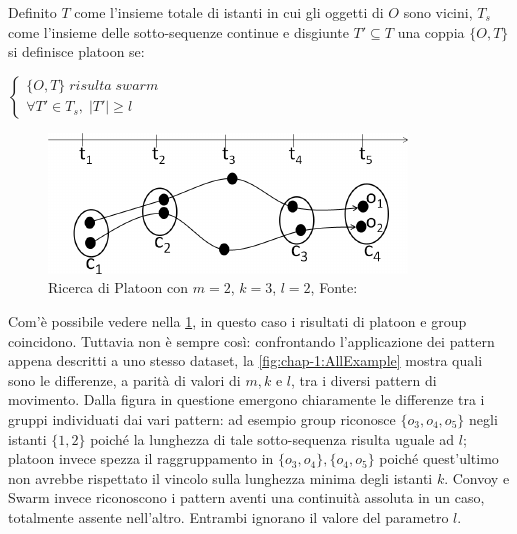 \begin{definition}[Platoon]\label{definition:platoon}
  Definito \(T\) come l'insieme totale di istanti in cui gli oggetti di \(O\) sono vicini,
  \(T_s\) come l'insieme delle sotto-sequenze continue e disgiunte \(T' \subseteq T\)
  una coppia \( \{ O, T \} \) si definisce platoon se:
  \begin{center}
    \(
      \begin{cases}
         \{ O, T \} \; risulta \; swarm   \\
      \forall T' \in T_{s}, \; |T'| \geq l
      \end{cases}
    \)
  \end{center}
\end{definition}

\begin{figure}
  \centering
  \includegraphics[width=\textwidth]{res/fig/sec-2/Group.pdf}
  \caption{Ricerca di Platoon con \(m = 2\), \(k = 3\), \(l=2\), Fonte:\cite{DBLP:journals/ijitdm/PhanPT16}}%
  \label{fig:chap-1:PlatoonExample}
\end{figure}

Com'è possibile vedere nella \cref{fig:chap-1:PlatoonExample}, in questo caso i risultati di platoon e group coincidono.
Tuttavia non è sempre così: confrontando l'applicazione dei pattern appena descritti a uno stesso dataset, la 
\cref{fig:chap-1:AllExample} mostra
quali sono le differenze, a parità di valori di \(m, k \) e \(l\), tra i diversi pattern di movimento.
Dalla figura in questione emergono chiaramente le differenze tra i gruppi individuati dai
vari pattern: ad esempio group riconosce \( \{ o_{3}, o_{4}, o_{5}\} \) negli istanti \( \{ 1, 2 \} \)
poiché la lunghezza di tale sotto-sequenza risulta uguale ad \(l\); platoon invece spezza
il raggruppamento in \( \{ o_{3}, o_{4} \}, \{ o_{4}, o_{5} \} \) poiché quest'ultimo non
avrebbe rispettato il vincolo sulla lunghezza minima degli istanti \(k\).
Convoy e Swarm invece riconoscono i pattern aventi una continuità assoluta in un caso,
totalmente assente nell'altro.
Entrambi ignorano il valore del parametro \(l\).

